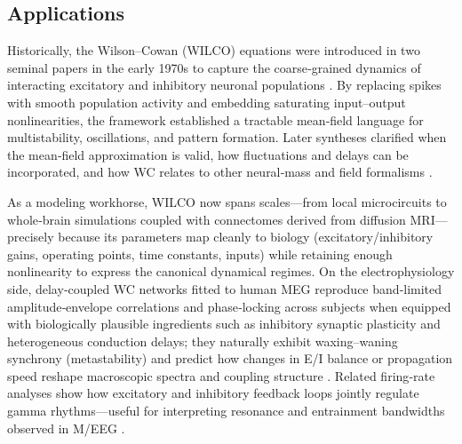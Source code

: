 \documentclass[11pt]{article}
\numberwithin{equation}{section}
\begin{document}
\subsection{Applications}

Historically, the Wilson--Cowan (WILCO) equations were introduced in two seminal papers in the early 1970s to capture the coarse‑grained dynamics of interacting excitatory and inhibitory neuronal populations \cite{WilsonCowan1972,WilsonCowan1973}. By replacing spikes with smooth population activity and embedding saturating input–output nonlinearities, the framework established a tractable mean‑field language for multistability, oscillations, and pattern formation. Later syntheses clarified when the mean‑field approximation is valid, how fluctuations and delays can be incorporated, and how WC relates to other neural‑mass and field formalisms \cite{DestexheSejnowski2009,Cowan2016,ChowKarimipanah2020}.

As a modeling workhorse, WILCO now spans scales—from local microcircuits to whole‑brain simulations coupled with connectomes derived from diffusion MRI—precisely because its parameters map cleanly to biology (excitatory/inhibitory gains, operating points, time constants, inputs) while retaining enough nonlinearity to express the canonical dynamical regimes. On the electrophysiology side, delay‑coupled WC networks fitted to human MEG reproduce band‑limited amplitude‑envelope correlations and phase‑locking across subjects when equipped with biologically plausible ingredients such as inhibitory synaptic plasticity and heterogeneous conduction delays; they naturally exhibit waxing–waning synchrony (metastability) and predict how changes in E/I balance or propagation speed reshape macroscopic spectra and coupling structure \cite{Abeysuriya2018}. Related firing‑rate analyses show how excitatory and inhibitory feedback loops jointly regulate gamma rhythms—useful for interpreting resonance and entrainment bandwidths observed in M/EEG \cite{Keeley2019}.
\end{document}
